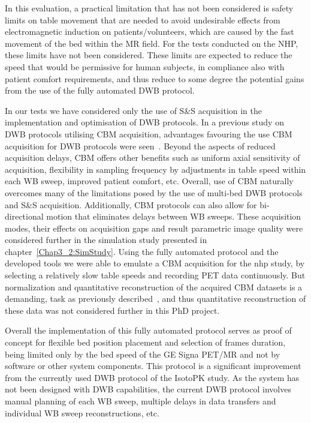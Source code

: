 In this evaluation, a practical limitation that has not been considered is safety limits on table movement that are needed to avoid undesirable effects from electromagnetic induction on patients/volunteers, which are caused by the fast movement of the bed within the MR field. For the tests conducted on the NHP, these limits have not been considered. These limits are expected to reduce the speed that would be permissive for human subjects, in compliance also with patient comfort requirements, and thus reduce to some degree the potential gains from the use of the fully automated DWB protocol. 

In our tests we have considered only the use of S\&S acquisition in the implementation and optimisation of DWB protocols. 
In a previous study on DWB protocols utilising CBM acquisition, advantages favouring the use CBM acquisition for DWB protocols were seen~\cite{Karakatsanis2016a}. Beyond the aspects of reduced acquisition delays, CBM offers other benefits such as uniform axial sensitivity of acquisition, flexibility in sampling frequency by adjustments in table speed within each WB sweep, improved patient comfort, etc. 
Overall, use of CBM naturally overcomes many of the limitations posed by the use of multi-bed DWB protocols and S\&S acquisition. 
Additionally, CBM protocols can also allow for bi-directional motion that eliminates delays between WB sweeps. 
These acquisition modes, their effects on acquisition gaps and result parametric image quality were considered further in the simulation study presented in chapter~\ref{Chap3_2:SimStudy}.
Using the fully automated protocol and the developed tools we were able to emulate a CBM acquisition for the \gls{nhp} study, by selecting a relatively slow table speeds and recording PET data continuously. But normalization and quantitative reconstruction of the acquired CBM datasets is a demanding, task as previously described~\cite{Panin2014}, and thus quantitative reconstruction of these data was not considered further in this PhD project.

Overall the implementation of this fully automated protocol serves as proof of concept for flexible bed position placement and selection of frames duration, being limited only by the bed speed of the GE Signa PET/MR and not by software or other system components. This protocol is a significant improvement from the currently used DWB protocol of the IsotoPK study. As the system has not been designed with DWB capabilities, the current DWB protocol involves manual planning of each WB sweep, multiple delays in data transfers and individual WB sweep reconstructions, etc. 

